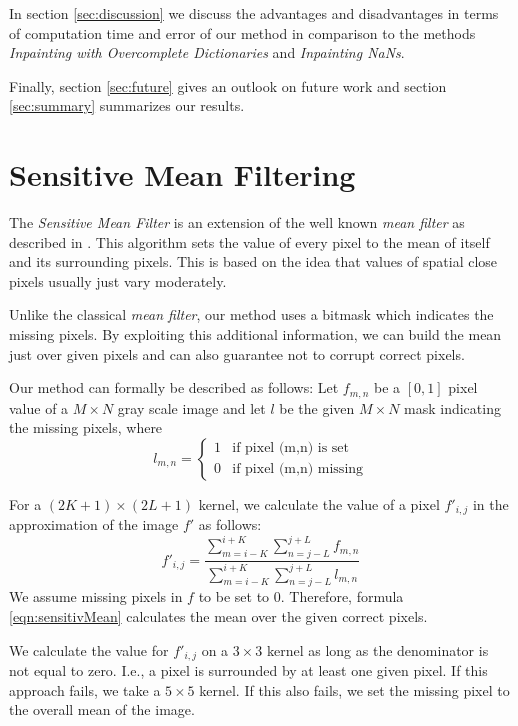 \documentclass[10pt,conference,compsocconf]{IEEEtran}
\begin{document}
In section \ref{sec:discussion} we discuss the advantages and disadvantages in terms of computation time and error of our method in comparison to the methods \emph{Inpainting with Overcomplete Dictionaries} and \emph{Inpainting NaNs}.

Finally, section \ref{sec:future} gives an outlook on future work and section \ref{sec:summary} summarizes our results.


\section{Sensitive Mean Filtering}
\label{sec:mean_filtering}
The \emph{Sensitive Mean Filter} is an extension of the well known \emph{mean filter} as described in \cite{McDonnell198165}. This algorithm sets the value of every pixel to the mean of itself and its surrounding pixels. This is based on the idea that values of spatial close pixels usually just vary moderately.

Unlike the classical \emph{mean filter}, our method uses a bitmask which indicates the missing pixels. By exploiting this additional information, we can build the mean just over given pixels and can also guarantee not to corrupt correct pixels.

Our method can formally be described as follows:
Let $f_{m,n}$ be a $[0,1]$ pixel value of a $M \times N$ gray scale image and let $l$ be the given $M \times N$ mask indicating the missing pixels, where
\begin{equation}
 l_{m,n} = 
 \left\{
 \begin{array}{ll}
  1 & \text{if pixel (m,n) is set} \\
  0 & \text{if pixel (m,n) missing}
 \end{array}
 \right.
\end{equation}

For a $(2K + 1) \times (2L + 1)$ kernel, we calculate the value of a pixel $f'_{i,j}$ in the approximation of the image $f'$ as follows:
\begin{equation}
\label{eqn:sensitivMean}
 f'_{i,j} = 
  \frac{\sum\limits_{m=i-K}^{i+K}\sum\limits_{n=j-L}^{j+L} f_{m,n}}{\sum\limits_{m=i-K}^{i+K}\sum\limits_{n=j-L}^{j+L} l_{m,n}} 
\end{equation}
We assume missing pixels in $f$ to be set to 0. Therefore, formula \ref{eqn:sensitivMean} calculates the mean over the given correct pixels.

We calculate the value for $f'_{i,j}$ on a $3 \times 3$ kernel as long as the denominator is not equal to zero. I.e., a pixel is surrounded by at least one given pixel. If this approach fails, we take a  $5 \times 5$ kernel. If this also fails, we set the missing pixel to the overall mean of the image.
\end{document}
